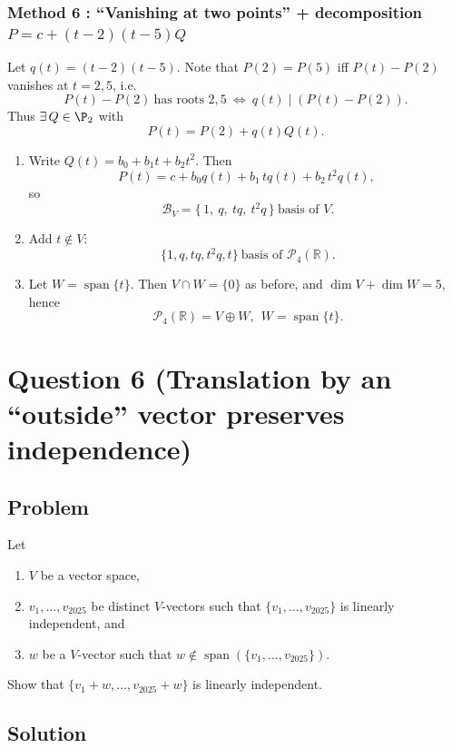\documentclass[12pt]{article}
\newcommand{\R}{\mathbb{R}}
\newcommand{\Span}{\operatorname{span}}
\newcommand{\Pfour}{\mathcal{P}_4(\R)}
\begin{document}
\subsubsection{Method 6 : “Vanishing at two points” + decomposition \(P=c+(t-2)(t-5)Q\)}
Let \(q(t)=(t-2)(t-5)\). Note that \(P(2)=P(5)\) iff \(P(t)-P(2)\) vanishes at \(t=2,5\), i.e.
\[
P(t)-P(2)\ \text{has roots }2,5\ \Longleftrightarrow\ q(t)\mid (P(t)-P(2)).
\]
Thus \(\exists\,Q\in\P_2\) with
\[
P(t)=P(2)+q(t)Q(t).
\]

\begin{enumerate}[label=(\alph*)]
\item Write \(Q(t)=b_0+b_1 t+b_2 t^2\). Then
\[
P(t)=c+b_0 q(t)+b_1\,tq(t)+b_2\,t^2q(t),
\]
so
\[
\boxed{\ \mathcal B_V=\{\,1,\ q,\ tq,\ t^2q\,\}\ \text{basis of }V. }
\]

\item Add \(t\notin V\):
\[
\boxed{\ \{1,q,tq,t^2q,t\}\ \text{basis of }\Pfour. }
\]

\item Let \(W=\Span\{t\}\). Then \(V\cap W=\{0\}\) as before, and \(\dim V+\dim W=5\), hence
\[
\boxed{\ \Pfour=V\oplus W,\ \ W=\Span\{t\}. }
\]
\end{enumerate}

\newpage
\section{Question 6 (Translation by an ``outside'' vector preserves independence)}
\subsection{Problem}
Let
\begin{enumerate}[label=(\alph*)]
\item \(V\) be a vector space,
\item \(v_1,\ldots,v_{2025}\) be distinct \(V\)-vectors such that \(\{v_1,\ldots,v_{2025}\}\) is linearly independent, and
\item \(w\) be a \(V\)-vector such that \(w\notin \Span(\{v_1,\ldots,v_{2025}\})\).
\end{enumerate}
Show that \(\{v_1+w,\ldots,v_{2025}+w\}\) is linearly independent.

\subsection{Solution}
\end{document}
